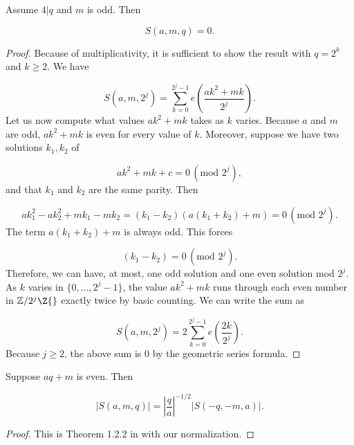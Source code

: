 \documentclass[11pt]{amsart}
\begin{document}
\begin{lemma}\label{4: OddForPower4Lemma}
    Assume $4|q$ and $m$ is odd. Then

        \begin{equation}\label{4: GaussSummsMultiplicativeEqn}
        S(a,m,q) = 0.
    \end{equation}
\end{lemma}
\begin{proof}
    Because of multiplicativity, it is sufficient to show the result with $q=2^k$ and $k\geq 2$. We have


    \begin{equation*}
        S(a,m,2^j) = \sum_{k=0}^{2^j-1}e(\frac{ak^2+mk}{2^j}).
    \end{equation*}
    Let us now compute what values $ak^2+mk$ takes as $k$ varies. Because $a$ and $m$ are odd, $ak^2+mk$ is even for every value of $k$. Moreover, suppose we have two solutions $k_1,k_2$ of

    \begin{equation*}
        ak^2+mk + c = 0  \,(\text{mod }2^j),
    \end{equation*}
    and that $k_1$ and $k_2$ are the same parity. Then

    \begin{equation*}
        ak_1^2-ak_2^2 + mk_1 - mk_2 = (k_1-k_2)(a(k_1+k_2)+m) = 0 \,(\text{mod }2^j).
    \end{equation*}
    The term $a(k_1+k_2)+m$ is always odd. This forces 

    \begin{equation*}
        (k_1-k_2) = 0\,(\text{mod }2^j).
    \end{equation*}
    Therefore, we can have, at most, one odd solution and one even solution mod $2^j$. As $k$ varies in $\{0,...,2^{j}-1\}$, the value $ak^2+mk$ runs through each even number in $\mathbb{Z}/2^j\Z{}$ exactly twice by basic counting. We can write the sum as

    \begin{equation*}
        S(a,m,2^j) = 2 \sum_{k=0}^{2^{j}-1}e(\frac{2k}{2^j}).
    \end{equation*}
    Because $j\geq 2$, the above sum is 0 by the geometric series formula.
    
\end{proof}

\begin{lemma}\label{4: QuadRecipGaussSumLemma}
    Suppose $aq+m$ is even. Then

        \begin{equation}\label{4: QuadRecipGaussSumEqn}
        |S(a,m,q)| = |\frac{q}{a}|^{-1/2}|S(-q,-m,a)|.
    \end{equation}
\end{lemma}
\begin{proof}
    This is Theorem 1.2.2 in \cite{GaussJacobiBook} with our normalization.
\end{proof}
\end{document}
